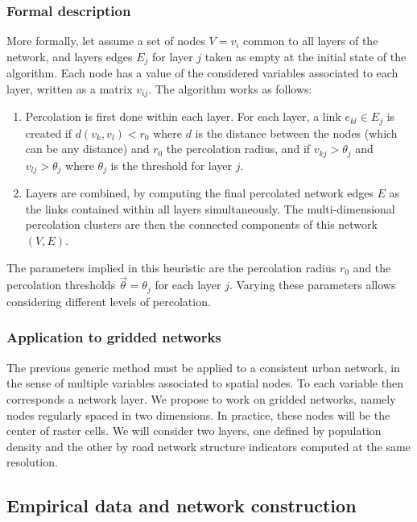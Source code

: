 \documentclass{jimis-en}
\begin{document}
\subsubsection{Formal description}

More formally, let assume a set of nodes $V = v_i$ common to all layers of the network, and layers edges $E_j$ for layer $j$ taken as empty at the initial state of the algorithm. Each node has a value of the considered variables associated to each layer, written as a matrix $v_{ij}$. The algorithm works as follows:
\begin{enumerate}
	\item Percolation is first done within each layer. For each layer, a link $e_{kl} \in E_j$ is created if $d(v_k,v_l) < r_0$ where $d$ is the distance between the nodes (which can be any distance) and $r_0$ the percolation radius, and if $v_{kj} > \theta_j$ and $v_{lj} > \theta_j$ where $\theta_j$ is the threshold for layer $j$.
	\item Layers are combined, by computing the final percolated network edges $E$ as the links contained within all layers simultaneously. The multi-dimensional percolation clusters are then the connected components of this network $(V,E)$.
\end{enumerate}

 
The parameters implied in this heuristic are the percolation radius $r_0$ and the percolation thresholds $\vec{\theta} = \theta_j$ for each layer $j$. Varying these parameters allows considering different levels of percolation.



\subsubsection{Application to gridded networks}

The previous generic method must be applied to a consistent urban network, in the sense of multiple variables associated to spatial nodes. To each variable then corresponds a network layer. We propose to work on gridded networks, namely nodes regularly spaced in two dimensions. In practice, these nodes will be the center of raster cells. We will consider two layers, one defined by population density and the other by road network structure indicators computed at the same resolution.



\subsection{Empirical data and network construction}
\end{document}
